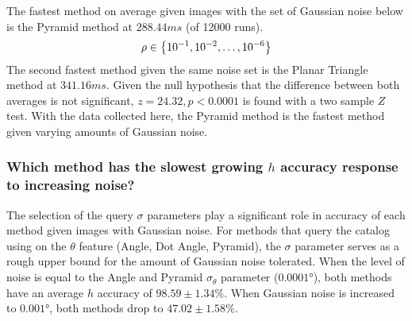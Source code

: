 %
%
%
%
The fastest method on average given images with the set of Gaussian noise below is the Pyramid method at
$288.44\si{ms}$ (of 12000 runs).
\begin{equation}\label{eq:sigmasTested}
    \rho \in \set{10^{-1}, 10^{-2}, \ldots, 10^{-6}}
\end{equation}
The second fastest method given the same noise set is the Planar Triangle method at $341.16\si{ms}$.
Given the null hypothesis that the difference between both averages is not significant, $z = 24.32, p < 0.0001$ is
found with a two sample $Z$ test.
With the data collected here, the Pyramid method is the fastest method given varying amounts of Gaussian noise.

\subsubsection{Which method has the slowest growing $h$ accuracy response to increasing noise?}
The selection of the query $\sigma$ parameters play a significant role in accuracy of each method given images with
Gaussian noise.
For methods that query the catalog using on the $\theta$ feature (Angle, Dot Angle, Pyramid), the $\sigma$ parameter
serves as a rough upper bound for the amount of Gaussian noise tolerated.
When the level of noise is equal to the Angle and Pyramid $\sigma_\theta$ parameter ($\ang{0.0001}$),
both methods have an average $h$ accuracy of $98.59 \pm 1.34\%$.
When Gaussian noise is increased to $\ang{0.001}$, both methods drop to $47.02 \pm 1.58\%$.

